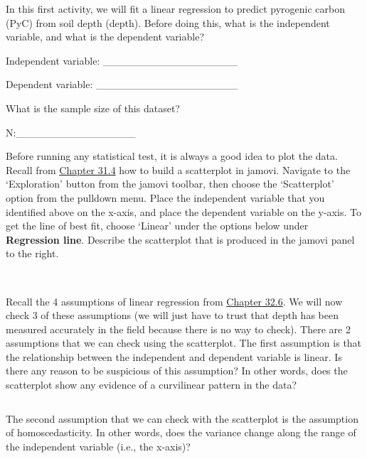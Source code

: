 \documentclass[
]{scrbook}
\begin{document}
In this first activity, we will fit a linear regression to predict pyrogenic carbon (PyC) from soil depth (depth).
Before doing this, what is the independent variable, and what is the dependent variable?

Independent variable: \_\_\_\_\_\_\_\_\_\_\_\_\_\_\_\_\_\_

Dependent variable: \_\_\_\_\_\_\_\_\_\_\_\_\_\_\_\_\_\_\_

What is the sample size of this dataset?

N:\_\_\_\_\_\_\_\_\_\_\_\_\_\_\_\_

Before running any statistical test, it is always a good idea to plot the data.
Recall from \protect\hyperlink{pearson-product-moment-correlation-test}{Chapter 31.4} how to build a scatterplot in jamovi.
Navigate to the `Exploration' button from the jamovi toolbar, then choose the `Scatterplot' option from the pulldown menu.
Place the independent variable that you identified above on the x-axis, and place the dependent variable on the y-axis.
To get the line of best fit, choose `Linear' under the options below under \textbf{Regression line}.
Describe the scatterplot that is produced in the jamovi panel to the right.

\begin{verbatim}


\end{verbatim}

Recall the 4 assumptions of linear regression from \protect\hyperlink{regression-assumptions}{Chapter 32.6}.
We will now check 3 of these assumptions (we will just have to trust that depth has been measured accurately in the field because there is no way to check).
There are 2 assumptions that we can check using the scatterplot.
The first assumption is that the relationship between the independent and dependent variable is linear.
Is there any reason to be suspicious of this assumption?
In other words, does the scatterplot show any evidence of a curvilinear pattern in the data?

\begin{verbatim}

\end{verbatim}

The second assumption that we can check with the scatterplot is the assumption of homoscedasticity.
In other words, does the variance change along the range of the independent variable (i.e., the x-axis)?

\begin{verbatim}

\end{verbatim}
\end{document}
